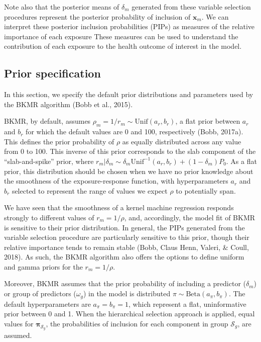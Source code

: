 \documentclass[12pt, twoside]{amherstthesis}
\begin{document}
Note also that the posterior means of \(\delta_m\) generated from these variable selection procedures represent the posterior probability of inclusion of \(\textbf{x}_m\). We can interpret these posterior inclusion probabilities (PIPs) as measures of the relative importance of each exposure These measures can be used to understand the contribution of each exposure to the health outcome of interest in the model.

\hypertarget{prior-specification}{%
\subsection{Prior specification}\label{prior-specification}}

In this section, we specify the default prior distributions and parameters used by the BKMR algorithm (Bobb et al., 2015).

BKMR, by default, assumes \(\rho_m=1/r_m \sim \text{Unif}(a_r,b_r)\), a flat prior between \(a_r\) and \(b_r\) for which the default values are 0 and 100, respectively (Bobb, 2017a). This defines the prior probability of \(\rho\) as equally distributed across any value from 0 to 100. This inverse of this prior corresponds to the slab component of the ``slab-and-spike'' prior, where \(r_m|\delta_m \sim \delta_m\text{Unif}^{-1}(a_r, b_r) + (1-\delta_m)P_0\). As a flat prior, this distribution should be chosen when we have no prior knowledge about the smoothness of the exposure-response function, with hyperparameters \(a_r\) and \(b_r\) selected to represent the range of values we expect \(\rho\) to potentially span.

We have seen that the smoothness of a kernel machine regression responds strongly to different values of \(r_m=1/\rho\), and, accordingly, the model fit of BKMR is sensitive to their prior distribution. In general, the PIPs generated from the variable selection procedure are particularly sensitive to this prior, though their relative importance tends to remain stable (Bobb, Claus Henn, Valeri, \& Coull, 2018). As such, the BKMR algorithm also offers the options to define uniform and gamma priors for the \(r_m=1/\rho\).

Moreover, BKMR assumes that the prior probability of including a predictor (\(\delta_m\)) or group of predictors (\(\omega_g\)) in the model is distributed \(\pi \sim \text{Beta}(a_\pi, b_\pi)\). The default hyperparameters are \(a_\pi=b_\pi=1\), which represent a flat, uninformative prior between 0 and 1. When the hierarchical selection approach is applied, equal values for \(\boldsymbol\pi_{\mathcal{S}_g}\), the probabilities of inclusion for each component in group \(\mathcal{S}_g\), are assumed.
\end{document}
